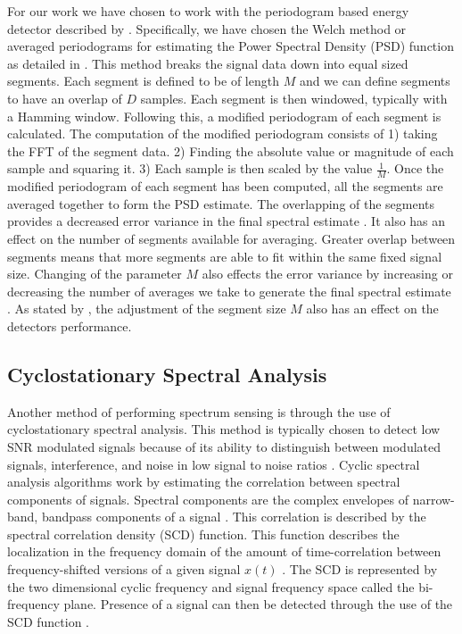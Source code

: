 For our work we have chosen to work with the periodogram based energy detector described by \cite{CabTkaBro06}.  Specifically, we have chosen the Welch method or averaged periodograms for estimating the Power Spectral Density (PSD) function as detailed in \cite{Welch67}.  This method breaks the signal data down into equal sized segments.  Each segment is defined to be of length $M$ and we can define segments to have an overlap of $D$ samples.  Each segment is then windowed, typically with a Hamming window.  Following this, a modified periodogram of each segment is calculated.  The computation of the modified periodogram consists of 1) taking the FFT of the segment data.  2) Finding the absolute value or magnitude of each sample and squaring it.  3) Each sample is then scaled by the value $\frac{1}{M}$.  Once the modified periodogram of each segment has been computed, all the segments are averaged together to form the PSD estimate.
The overlapping of the segments provides a decreased error variance in the final spectral estimate \cite{Welch67}.  It also has an effect on the number of segments available for averaging.  Greater overlap between segments means that more segments are able to fit within the same fixed signal size.  Changing of the parameter $M$ also effects the error variance by increasing or decreasing the number of averages we take to generate the final spectral estimate \cite{Welch67}.  As stated by \cite{CabTkaBro06}, the adjustment of the segment size $M$ also has an effect on the detectors performance.

\subsection{Cyclostationary Spectral Analysis}
\label{sect:cyclo}
Another method of performing spectrum sensing is through the use of cyclostationary spectral analysis.  This method is typically chosen to detect low SNR modulated signals because of its ability to distinguish between modulated signals, interference, and noise in low signal to noise ratios \cite{FenChenWan08}.  Cyclic spectral analysis algorithms work by estimating the correlation between spectral components of signals.  Spectral components are the complex envelopes of narrow-band, bandpass components of a signal \cite{RobBroLoo91}.  This correlation is described by the spectral correlation density (SCD) function.  This function describes the localization in the frequency domain of the amount of time-correlation between frequency-shifted versions of a given signal $x(t)$ \cite{Costa96}.  The SCD is represented by the two dimensional cyclic frequency and signal frequency space \cite{FenChenWan08} called the bi-frequency plane.  Presence of a signal can then be detected through the use of the SCD function \cite{Costa96}.

